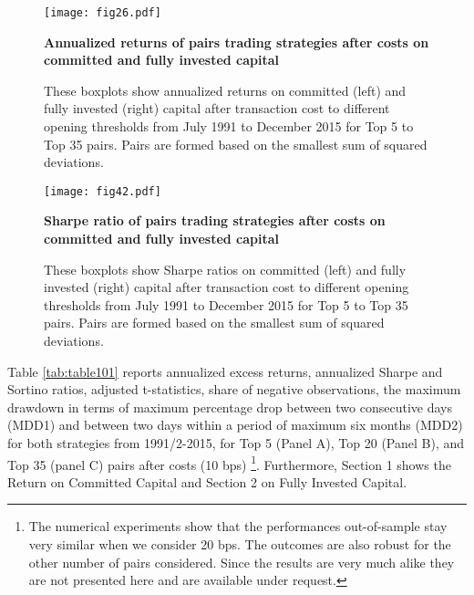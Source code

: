 \documentclass[a4paper]{article}
\begin{document}
\begin{figure}[H]
	\centering
	\texttt{[image: fig26.pdf]}
	\caption{\textbf{Annualized returns of pairs trading strategies after costs on committed and fully invested capital}}
	\caption*{\scriptsize These boxplots show annualized returns on committed (left) and fully invested (right) capital after transaction cost to different opening thresholds from July 1991 to December 2015 for Top 5 to Top 35 pairs. Pairs are formed based on the smallest sum of squared deviations.}
	\label{fig:fig25}
\end{figure}


\begin{figure}[H]
	\centering \tiny
	\texttt{[image: fig42.pdf]}
	\caption{\textbf {Sharpe ratio of pairs trading strategies after costs on committed and fully invested capital}}
	\caption*{\justifying \scriptsize These boxplots show Sharpe ratios on committed (left) and fully invested (right) capital after transaction cost to different opening thresholds from July 1991 to December 2015 for Top 5 to Top 35 pairs. Pairs are formed based on the smallest sum of squared deviations.}
	\label{fig:fig42}
\end{figure}

Table \ref{tab:table101} reports annualized excess returns, annualized Sharpe and Sortino ratios, \citet*{nw87} adjusted t-statistics, share of negative observations, the maximum drawdown in terms of maximum percentage drop between two consecutive days (MDD1) and between two days within a period of maximum six months (MDD2) for both strategies from 1991/2-2015, for Top 5 (Panel A), Top 20 (Panel B), and Top 35 (panel C) pairs after costs (10 bps) \footnote{The numerical experiments show that the performances out-of-sample stay very similar when we consider 20 bps. The outcomes are also robust for the other number of pairs considered. Since the results are very much alike they are not presented here and are available under request. }. Furthermore, Section 1 shows the Return on Committed Capital and Section 2 on Fully Invested Capital. %
	
\end{document}
